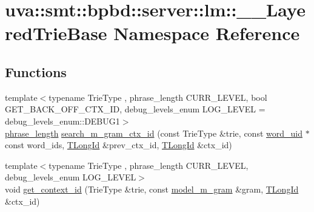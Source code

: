 \hypertarget{namespaceuva_1_1smt_1_1bpbd_1_1server_1_1lm_1_1_____layered_trie_base}{}\section{uva\+:\+:smt\+:\+:bpbd\+:\+:server\+:\+:lm\+:\+:\+\_\+\+\_\+\+Layered\+Trie\+Base Namespace Reference}
\label{namespaceuva_1_1smt_1_1bpbd_1_1server_1_1lm_1_1_____layered_trie_base}
\subsection*{Functions}
\begin{DoxyCompactItemize}
\item 
{\footnotesize template$<$typename Trie\+Type , phrase\+\_\+length C\+U\+R\+R\+\_\+\+L\+E\+V\+E\+L, bool G\+E\+T\+\_\+\+B\+A\+C\+K\+\_\+\+O\+F\+F\+\_\+\+C\+T\+X\+\_\+\+I\+D, debug\+\_\+levels\+\_\+enum L\+O\+G\+\_\+\+L\+E\+V\+E\+L = debug\+\_\+levels\+\_\+enum\+::\+D\+E\+B\+U\+G1$>$ }\\\hyperlink{namespaceuva_1_1smt_1_1bpbd_1_1server_af068a19c2e03116caf3e3827a3e40e35}{phrase\+\_\+length} \hyperlink{namespaceuva_1_1smt_1_1bpbd_1_1server_1_1lm_1_1_____layered_trie_base_aaee3fee0143880fcd495224ba8957c09}{search\+\_\+m\+\_\+gram\+\_\+ctx\+\_\+id} (const Trie\+Type \&trie, const \hyperlink{namespaceuva_1_1smt_1_1bpbd_1_1server_a6bfe45ba344d65a7fdd7d26156328ddc}{word\+\_\+uid} $\ast$const word\+\_\+ids, \hyperlink{namespaceuva_1_1smt_1_1bpbd_1_1server_1_1lm_1_1identifiers_a6841847096e455ad3c38689bc548b3b0}{T\+Long\+Id} \&prev\+\_\+ctx\+\_\+id, \hyperlink{namespaceuva_1_1smt_1_1bpbd_1_1server_1_1lm_1_1identifiers_a6841847096e455ad3c38689bc548b3b0}{T\+Long\+Id} \&ctx\+\_\+id)
\item 
{\footnotesize template$<$typename Trie\+Type , phrase\+\_\+length C\+U\+R\+R\+\_\+\+L\+E\+V\+E\+L, debug\+\_\+levels\+\_\+enum L\+O\+G\+\_\+\+L\+E\+V\+E\+L$>$ }\\void \hyperlink{namespaceuva_1_1smt_1_1bpbd_1_1server_1_1lm_1_1_____layered_trie_base_a0619b1b508acf2188d98b3d2f32142bc}{get\+\_\+context\+\_\+id} (Trie\+Type \&trie, const \hyperlink{classuva_1_1smt_1_1bpbd_1_1server_1_1lm_1_1m__grams_1_1model__m__gram}{model\+\_\+m\+\_\+gram} \&gram, \hyperlink{namespaceuva_1_1smt_1_1bpbd_1_1server_1_1lm_1_1identifiers_a6841847096e455ad3c38689bc548b3b0}{T\+Long\+Id} \&ctx\+\_\+id)
\end{DoxyCompactItemize}


